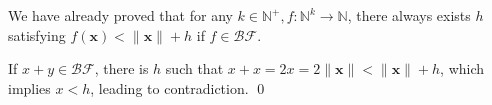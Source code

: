 \begin{pf} \rm
 We have already proved that for any $k\in\mathbb{N}^+, f:\mathbb{N}^k\to\mathbb{N}$,
there always exists $h$ satisfying $f(\mathbf{x})<\|\mathbf{x}\|+h$ if $f\in\mathcal{BF}$.

If $x+y\in\mathcal{BF}$, there is $h$ such that
$x + x = 2x = 2\|\mathbf{x}\| < \|\mathbf{x}\| + h$,
which implies $x < h$, leading to contradiction. \qed

\end{pf}
